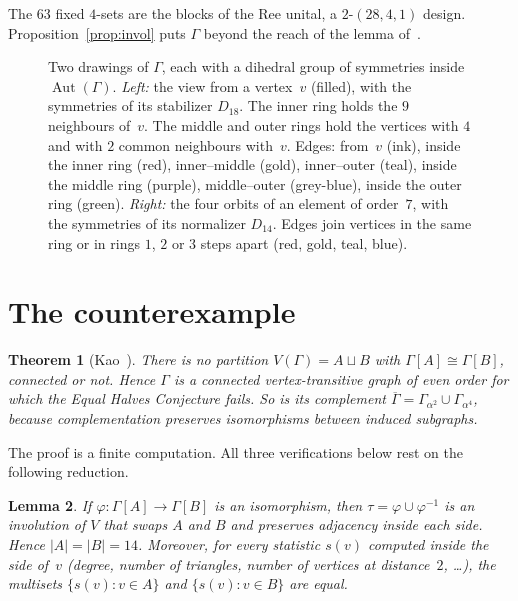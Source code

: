 \documentclass[11pt,a4paper]{article}
\newtheorem{theorem}{Theorem}
\newtheorem{lemma}[theorem]{Lemma}
\theoremstyle{definition}
\newcommand{\Aut}{\operatorname{Aut}}
\begin{document}
The $63$ fixed $4$-sets are the blocks of the Ree unital, a $2$-$(28,4,1)$
design. Proposition~\ref{prop:invol} puts $\Gamma$ beyond the reach of the
lemma of~\cite{G}.

\begin{figure}[t]
\centering
\begin{tikzpicture}[scale=3.6, line cap=round]
  
\end{tikzpicture}\hspace{0.6cm}%
\begin{tikzpicture}[scale=3.6, line cap=round]
  
\end{tikzpicture}
\caption{Two drawings of $\Gamma$, each with a dihedral group of symmetries
inside $\Aut(\Gamma)$. \emph{Left:} the view from a vertex~$v$ (filled), with
the symmetries of its stabilizer $D_{18}$. The inner ring holds the $9$
neighbours of~$v$. The middle and outer rings hold the vertices with $4$ and
with $2$ common neighbours with~$v$. Edges: from~$v$ (ink), inside the inner ring
(red), inner--middle (gold), inner--outer (teal), inside the middle ring
(purple), middle--outer (grey-blue), inside the outer ring (green).
\emph{Right:} the four orbits of an element of order~$7$, with the symmetries of
its normalizer $D_{14}$. Edges join vertices in the same ring or in rings $1$,
$2$ or $3$ steps apart (red, gold, teal, blue).}
\label{fig:graph}
\end{figure}

\section{The counterexample}\label{sec:proof}

\begin{theorem}[Kao~\cite{K,LtS}]\label{thm:main}
There is no partition $V(\Gamma)=A\sqcup B$ with $\Gamma[A]\cong\Gamma[B]$,
connected or not. Hence $\Gamma$ is a connected vertex-transitive graph of even
order for which the Equal Halves Conjecture fails. So is its complement
$\overline\Gamma=\Gamma_{\alpha^2}\cup\Gamma_{\alpha^4}$, because
complementation preserves isomorphisms between induced subgraphs.
\end{theorem}

The proof is a finite computation. All three verifications below rest on the
following reduction.

\begin{lemma}\label{lem:tau}
If $\varphi\colon\Gamma[A]\to\Gamma[B]$ is an isomorphism, then
$\tau=\varphi\cup\varphi^{-1}$ is an involution of $V$ that swaps $A$ and $B$
and preserves adjacency inside each side. Hence $|A|=|B|=14$. Moreover, for
every statistic $s(v)$ computed inside the side of~$v$ (degree, number of
triangles, number of vertices at distance~$2$, \dots), the multisets
$\{s(v):v\in A\}$ and $\{s(v):v\in B\}$ are equal.
\end{lemma}
\end{document}
